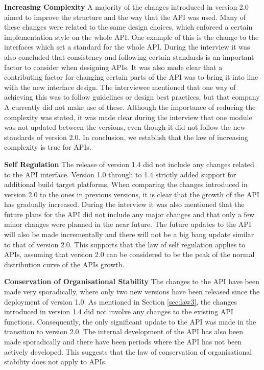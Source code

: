 \documentclass{sig-alternate}
\begin{document}
\smallskip \noindent
\textbf{Increasing Complexity  } \label{sec:law2} 
A majority of the changes introduced in version 2.0 aimed to improve the structure and the way that the API was used. Many of these changes were related to the same design choices, which enforced a certain implementation style on the whole API. One example of this is the change to the interfaces which set a standard for the whole API. During the interview it was also concluded that consistency and following certain standards is an important factor to consider when designing APIs. It was also made clear that a contributing factor for changing certain parts of the API was to bring it into line with the new interface design. The interviewee mentioned that one way of achieving this was to follow guidelines or design best practices, but that company A currently did not make use of these. Although the importance of reducing the complexity was stated, it was made clear during the interview that one module was not updated between the versions, even though it did not follow the new standards of version 2.0. In conclusion, we establish that the law of increasing complexity is true for APIs. 

\smallskip \noindent
\textbf{Self Regulation  } \label{sec:law3} 
The release of version 1.4 did not include any changes related to the API interface. Version 1.0 through to 1.4 strictly added support for additional build target platforms. When comparing the changes introduced in version 2.0 to the ones in previous versions, it is clear that the growth of the API has gradually increased. During the interview it was also mentioned that the future plans for the API did not include any major changes and that only a few minor changes were planned in the near future. The future updates to the API will also be made incrementally and there will not be a big bang update similar to that of version 2.0. This supports that the law of self regulation applies to APIs, assuming that version 2.0 can be considered to be the peak of the normal distribution curve of the APIs growth. 

\smallskip \noindent
\textbf{Conservation of Organisational Stability  } 
The changes to the API have been made very sporadically, where only two new versions have been released since the deployment of version 1.0. As mentioned in Section \ref{sec:law3}, the changes introduced in version 1.4 did not involve any changes to the existing API functions. Consequently, the only significant update to the API was made in the transition to version 2.0. The internal development of the API has also been made sporadically and there have been periods where the API has not been actively developed. This suggests that the law of conservation of organisational stability does not apply to APIs. 
\end{document}
